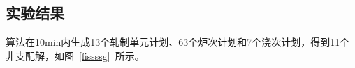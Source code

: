 \documentclass{whutmod}
\begin{document}
\subsection{实验结果}
算法在10min内生成13个轧制单元计划、63个炉次计划和7个浇次计划，得到11个非支配解，如图~\ref{fissssg}~所示。
\begin{figure}[H]
\centering
{}
\end{figure}	
\end{document}
